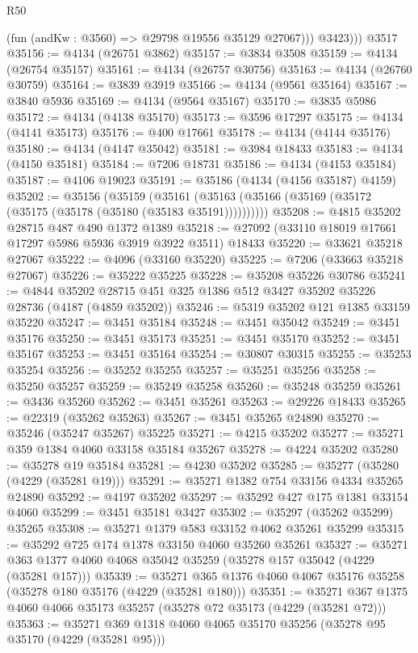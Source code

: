 \begin{lexlean}{R50}
\begin{coremodule}
            (fun (andKw : @3560) => @29798 @19556 @35129 @27067)))
          @3423)))
    @3517
@35156 := @4134 (@26751 @3862)
@35157 := @3834 @3508
@35159 := @4134 (@26754 @35157)
@35161 := @4134 (@26757 @30756)
@35163 := @4134 (@26760 @30759)
@35164 := @3839 @3919
@35166 := @4134 (@9561 @35164)
@35167 := @3840 @5936
@35169 := @4134 (@9564 @35167)
@35170 := @3835 @5986
@35172 := @4134 (@4138 @35170)
@35173 := @3596 @17297
@35175 := @4134 (@4141 @35173)
@35176 := @400 @17661
@35178 := @4134 (@4144 @35176)
@35180 := @4134 (@4147 @35042)
@35181 := @3984 @18433
@35183 := @4134 (@4150 @35181)
@35184 := @7206 @18731
@35186 := @4134 (@4153 @35184)
@35187 := @4106 @19023
@35191 := @35186 (@4134 (@4156 @35187) @4159)
@35202 := @35156
    (@35159 (@35161 (@35163 (@35166 (@35169 (@35172 (@35175 (@35178 (@35180 (@35183 @35191))))))))))
@35208 := @4815 @35202 @28715 @487 @490 @1372 @1389
@35218 := @27092 (@33110 @18019 @17661 @17297 @5986 @5936 @3919 @3922 @3511) @18433
@35220 := @33621 @35218 @27067
@35222 := @4096 (@33160 @35220)
@35225 := @7206 (@33663 @35218 @27067)
@35226 := @35222 @35225
@35228 := @35208 @35226 @30786
@35241 := @4844 @35202 @28715 @451 @325 @1386 @512 @3427 @35202 @35226 @28736 (@4187 (@4859 @35202))
@35246 := @5319 @35202 @121 @1385 @33159 @35220
@35247 := @3451 @35184
@35248 := @3451 @35042
@35249 := @3451 @35176
@35250 := @3451 @35173
@35251 := @3451 @35170
@35252 := @3451 @35167
@35253 := @3451 @35164
@35254 := @30807 @30315
@35255 := @35253 @35254
@35256 := @35252 @35255
@35257 := @35251 @35256
@35258 := @35250 @35257
@35259 := @35249 @35258
@35260 := @35248 @35259
@35261 := @3436 @35260
@35262 := @3451 @35261
@35263 := @29226 @18433
@35265 := @22319 (@35262 @35263)
@35267 := @3451 @35265 @24890
@35270 := @35246 (@35247 @35267) @35225
@35271 := @4215 @35202
@35277 := @35271 @359 @1384 @4060 @33158 @35184 @35267
@35278 := @4224 @35202
@35280 := @35278 @19 @35184
@35281 := @4230 @35202
@35285 := @35277 (@35280 (@4229 (@35281 @19)))
@35291 := @35271 @1382 @754 @33156 @4334 @35265 @24890
@35292 := @4197 @35202
@35297 := @35292 @427 @175 @1381 @33154 @4060
@35299 := @3451 @35181 @3427
@35302 := @35297 (@35262 @35299) @35265
@35308 := @35271 @1379 @583 @33152 @4062 @35261 @35299
@35315 := @35292 @725 @174 @1378 @33150 @4060 @35260 @35261
@35327 := @35271 @363 @1377 @4060 @4068 @35042 @35259 (@35278 @157 @35042 (@4229 (@35281 @157)))
@35339 := @35271 @365 @1376 @4060 @4067 @35176 @35258 (@35278 @180 @35176 (@4229 (@35281 @180)))
@35351 := @35271 @367 @1375 @4060 @4066 @35173 @35257 (@35278 @72 @35173 (@4229 (@35281 @72)))
@35363 := @35271 @369 @1318 @4060 @4065 @35170 @35256 (@35278 @95 @35170 (@4229 (@35281 @95)))

\end{coremodule}
\end{lexlean}

